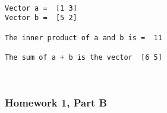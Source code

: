 \documentclass[11pt]{article}
\begin{document}
    \begin{Verbatim}[commandchars=\\\{\}]

Vector a =  [1 3]
Vector b =  [5 2]

The inner product of a and b is =  11

The sum of a + b is the vector  [6 5]

    \end{Verbatim}

    \begin{center}
    \end{center}
    { \hspace*{\fill} \\}
    
    \subsubsection{Homework 1, Part B}\label{homework-1-part-b}
\end{document}
